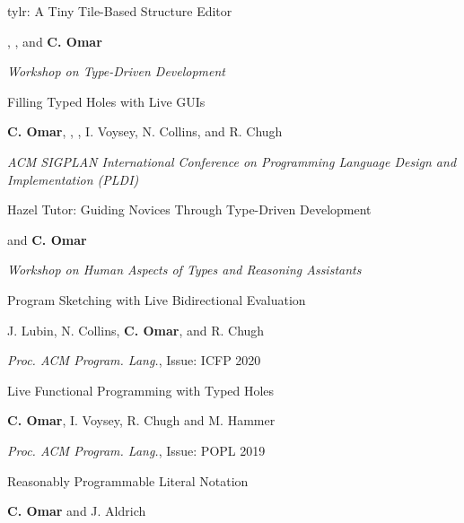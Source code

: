 \documentclass[10pt,letterpaper]{article}
\renewenvironment{itemize}{
  \begin{list}{}{
    \setlength{\leftmargin}{1.25em}
    \setlength{\itemsep}{0.25em}
    \setlength{\parskip}{0pt}
    \setlength{\parsep}{0.2em}
  }
}{
  \end{list}
}
\begin{document}
\begin{enumerate}[leftmargin=*, labelindent=6.5em, font=\bfseries]
  \item[TyDe 2022] {tylr: A Tiny Tile-Based Structure Editor}
        \begin{itemize} 
          \item {}, , and \textbf{C. Omar}
          \item \textit{Workshop on Type-Driven Development}
        \end{itemize}
  \item[PLDI 2021] {Filling Typed Holes with Live GUIs}
        \begin{itemize}
          \item \textbf{C. Omar}, , , I. Voysey, N. Collins, and R. Chugh
          \item \textit{ACM SIGPLAN International Conference on Programming Language Design and Implementation (PLDI)}
        \end{itemize}
  \item[HATRA 2020] Hazel Tutor: Guiding Novices Through Type-Driven Development
        \begin{itemize}
          \item {} and \textbf{C. Omar}
          \item \textit{Workshop on Human Aspects of Types and Reasoning Assistants}
        \end{itemize}
  \item[ICFP 2020] {Program Sketching with Live Bidirectional Evaluation}
        \begin{itemize}
          \item J. Lubin, N. Collins, \textbf{C. Omar}, and R. Chugh
          \item \textit{Proc. ACM Program. Lang.}, Issue: ICFP 2020
        \end{itemize}
  \item[POPL 2019] {Live Functional Programming with Typed Holes}
        \begin{itemize}
          \item \textbf{C. Omar}, I. Voysey, R. Chugh and M. Hammer
          \item \textit{Proc. ACM Program. Lang.}, Issue: POPL 2019
        \end{itemize}
  \item[ICFP 2018] {Reasonably Programmable Literal Notation}
        \begin{itemize}
          \item \textbf{C. Omar} and J. Aldrich

\end{itemize}
\end{enumerate}
\end{document}
